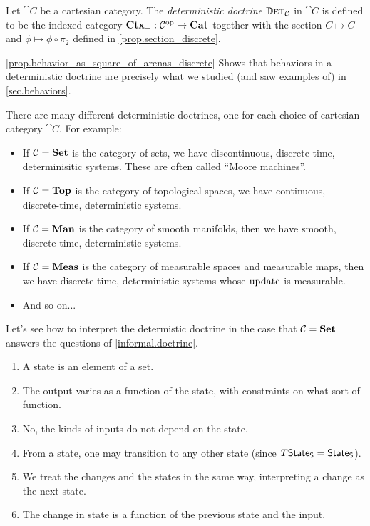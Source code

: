 \documentclass[DynamicalBook]{subfiles}
\begin{document}
\begin{definition}
  Let $\cat{C}$ be a cartesian category. The \emph{deterministic doctrine}
  $\mathbb{D}\textsc{et}_{\mathcal{C}}$ in $\cat{C}$ is defined to be the indexed category
  $\textbf{Ctx}_{-}: \mathcal{C}^{\textnormal{op}} \to \textbf{Cat}$ together with the section $C \mapsto C$
  and $\phi \mapsto \phi \circ \pi_2$ defined in \cref{prop.section_discrete}.
\end{definition}

\begin{remark}
 \cref{prop.behavior_as_square_of_arenas_discrete} Shows that behaviors in a
 deterministic doctrine are precisely what we studied (and saw examples of) in \cref{sec.behaviors}.
\end{remark}

There are many different deterministic doctrines, one for each choice of
cartesian category $\cat{C}$. For example:
\begin{itemize}
  \item If $\mathcal{C} = \textbf{Set}$ is the category of sets, we have discontinuous, discrete-time,
    determinisitic systems. These are often called ``Moore machines''.
  \item If $\mathcal{C} = \textbf{Top}$ is the category of topological spaces, we have
    continuous, discrete-time, deterministic systems.
  \item If $\mathcal{C} = \textbf{Man}$ is the category of smooth manifolds, then we
    have smooth, discrete-time, deterministic systems.
  \item If $\mathcal{C} = \textbf{Meas}$ is the category of measurable spaces and
    measurable maps, then we have discrete-time, deterministic systems whose
    $\mathrm{update}_{\mathsf{}}$ is measurable.
  \item And so on...
\end{itemize}

Let's see how to interpret the determistic doctrine in the case that $\mathcal{C} =
\textbf{Set}$ answers the questions of \cref{informal.doctrine}.
\begin{enumerate}
 \item A state is an element of a set.
 \item The output varies as a function of the state, with constraints on what
   sort of function.
 \item No, the kinds of inputs do not depend on the state.
 \item From a state, one may transition to any other state (since $T\mathsf{State}_{\mathsf{S}} = \mathsf{State}_{\mathsf{S}}$).
 \item We treat the changes and the states in the same way, interpreting a
   change as the next state.
 \item The change in state is a function of the previous state and the input.
\end{enumerate}
\end{document}
